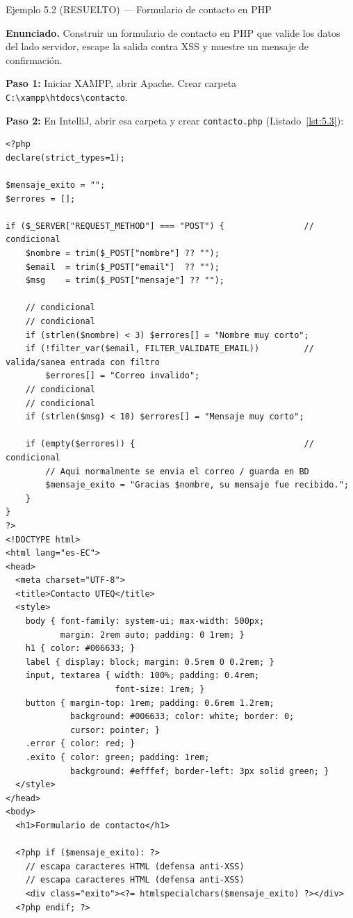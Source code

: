 \documentclass[11pt,a4paper,openany]{book}
\begin{document}
\begin{cajaejemplo}{Ejemplo 5.2 (RESUELTO) --- Formulario de contacto en PHP}


\textbf{Enunciado.} Construir un formulario de contacto en PHP que valide los datos del lado servidor, escape la salida contra XSS y muestre un mensaje de confirmación.

\textbf{Paso 1:} Iniciar XAMPP, abrir Apache. Crear carpeta
\texttt{C:\textbackslash{}xampp\textbackslash{}htdocs\textbackslash{}contacto}.

\textbf{Paso 2:} En IntelliJ, abrir esa carpeta y crear
\texttt{contacto.php} (Listado~\ref{lst:5.3}):

\begin{lstlisting}[style=php,caption={contacto.php},label=lst:5.3]
<?php
declare(strict_types=1);

$mensaje_exito = "";
$errores = [];

if ($_SERVER["REQUEST_METHOD"] === "POST") {                // condicional
    $nombre = trim($_POST["nombre"] ?? "");
    $email  = trim($_POST["email"]  ?? "");
    $msg    = trim($_POST["mensaje"] ?? "");

    // condicional
    // condicional
    if (strlen($nombre) < 3) $errores[] = "Nombre muy corto";
    if (!filter_var($email, FILTER_VALIDATE_EMAIL))         // valida/sanea entrada con filtro
        $errores[] = "Correo invalido";
    // condicional
    // condicional
    if (strlen($msg) < 10) $errores[] = "Mensaje muy corto";

    if (empty($errores)) {                                  // condicional
        // Aqui normalmente se envia el correo / guarda en BD
        $mensaje_exito = "Gracias $nombre, su mensaje fue recibido.";
    }
}
?>
<!DOCTYPE html>
<html lang="es-EC">
<head>
  <meta charset="UTF-8">
  <title>Contacto UTEQ</title>
  <style>
    body { font-family: system-ui; max-width: 500px;
           margin: 2rem auto; padding: 0 1rem; }
    h1 { color: #006633; }
    label { display: block; margin: 0.5rem 0 0.2rem; }
    input, textarea { width: 100%; padding: 0.4rem;
                      font-size: 1rem; }
    button { margin-top: 1rem; padding: 0.6rem 1.2rem;
             background: #006633; color: white; border: 0;
             cursor: pointer; }
    .error { color: red; }
    .exito { color: green; padding: 1rem;
             background: #efffef; border-left: 3px solid green; }
  </style>
</head>
<body>
  <h1>Formulario de contacto</h1>

  <?php if ($mensaje_exito): ?>
    // escapa caracteres HTML (defensa anti-XSS)
    // escapa caracteres HTML (defensa anti-XSS)
    <div class="exito"><?= htmlspecialchars($mensaje_exito) ?></div>
  <?php endif; ?>


\end{lstlisting}
\end{cajaejemplo}
\end{document}
